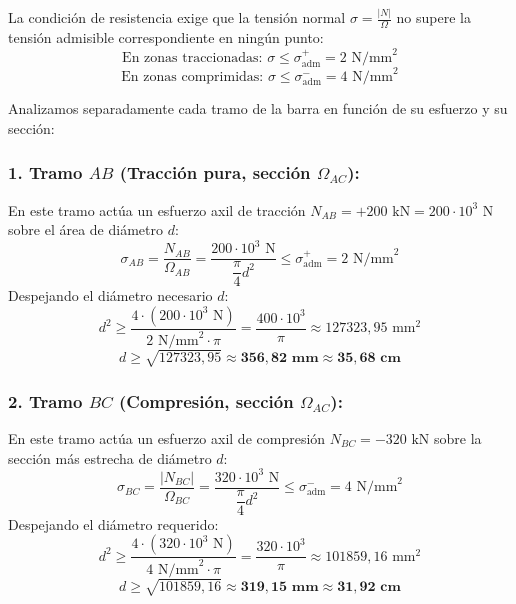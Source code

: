 
La condición de resistencia exige que la tensión normal $\sigma = \frac{|N|}{\Omega}$ no supere la tensión admisible correspondiente en ningún punto:
\begin{equation}
    \text{En zonas traccionadas: } \sigma \leq \sigma_{\text{adm}}^+ = 2\text{ N/mm}^2
\end{equation}
\begin{equation}
    \text{En zonas comprimidas: } \sigma \leq \sigma_{\text{adm}}^- = 4\text{ N/mm}^2
\end{equation}

Analizamos separadamente cada tramo de la barra en función de su esfuerzo y su sección:

\subsubsection*{1. Tramo $AB$ (Tracción pura, sección $\Omega_{AC}$):}
En este tramo actúa un esfuerzo axil de tracción $N_{AB} = +200\text{ kN} = 200 \cdot 10^3\text{ N}$ sobre el área de diámetro $d$:
\begin{equation}
    \sigma_{AB} = \frac{N_{AB}}{\Omega_{AB}} = \frac{200 \cdot 10^3\text{ N}}{\dfrac{\pi}{4}d^2} \leq \sigma_{\text{adm}}^+ = 2\text{ N/mm}^2
\end{equation}
Despejando el diámetro necesario $d$:
\begin{equation}
    d^2 \geq \frac{4 \cdot (200 \cdot 10^3\text{ N})}{2\text{ N/mm}^2 \cdot \pi} = \frac{400 \cdot 10^3}{\pi} \approx 127323{,}95\text{ mm}^2
\end{equation}
\begin{equation}
    d \geq \sqrt{127323{,}95} \approx \mathbf{356{,}82\text{ mm}} \approx \mathbf{35{,}68\text{ cm}}
    \label{eq:d_traccion}
\end{equation}

\subsubsection*{2. Tramo $BC$ (Compresión, sección $\Omega_{AC}$):}
En este tramo actúa un esfuerzo axil de compresión $N_{BC} = -320\text{ kN}$ sobre la sección más estrecha de diámetro $d$:
\begin{equation}
    \sigma_{BC} = \frac{|N_{BC}|}{\Omega_{BC}} = \frac{320 \cdot 10^3\text{ N}}{\dfrac{\pi}{4}d^2} \leq \sigma_{\text{adm}}^- = 4\text{ N/mm}^2
\end{equation}
Despejando el diámetro requerido:
\begin{equation}
    d^2 \geq \frac{4 \cdot (320 \cdot 10^3\text{ N})}{4\text{ N/mm}^2 \cdot \pi} = \frac{320 \cdot 10^3}{\pi} \approx 101859{,}16\text{ mm}^2
\end{equation}
\begin{equation}
    d \geq \sqrt{101859{,}16} \approx \mathbf{319{,}15\text{ mm}} \approx \mathbf{31{,}92\text{ cm}}
    \label{eq:d_compresion_BC}
\end{equation}

